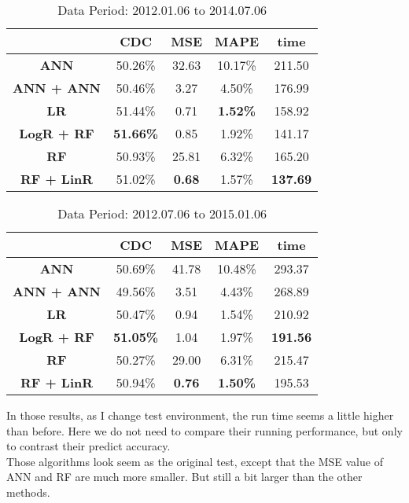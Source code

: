 \begin{table}[h]
	\centering
	\begin{tabular}{|c|c|c|c|c|}
		\hline
		\textbf{}         & \textbf{CDC}     & \textbf{MSE}  & \textbf{MAPE}   & \textbf{time}   \\ \hline
		\textbf{ANN}       & 50.26\%          & 32.63         & 10.17\%         & 211.50          \\ \hline
		\textbf{ANN + ANN} & 50.46\%          & 3.27          & 4.50\%          & 176.99          \\ \hline
		\textbf{LR}        & 51.44\%          & 0.71          & \textbf{1.52\%} & 158.92          \\ \hline
		\textbf{LogR + RF} & \textbf{51.66\%} & 0.85          & 1.92\%          & 141.17          \\ \hline
		\textbf{RF}        & 50.93\%          & 25.81         & 6.32\%          & 165.20          \\ \hline
		\textbf{RF + LinR} & 51.02\%          & \textbf{0.68} & 1.57\%          & \textbf{137.69} \\ \hline
	\end{tabular}
	\caption{Data Period: 2012.01.06 to 2014.07.06}
	\label{tb:DataPeriod3}
\end{table}


\begin{table}[h]
	\centering
	\begin{tabular}{|c|c|c|c|c|}
		\hline
		& \textbf{CDC}     & \textbf{MSE}  & \textbf{MAPE}   & \textbf{time}   \\ \hline
		\textbf{ANN}       & 50.69\%          & 41.78         & 10.48\%         & 293.37          \\ \hline
		\textbf{ANN + ANN} & 49.56\%          & 3.51          & 4.43\%          & 268.89          \\ \hline
		\textbf{LR}        & 50.47\%          & 0.94          & 1.54\%          & 210.92          \\ \hline
		\textbf{LogR + RF} & \textbf{51.05\%} & 1.04          & 1.97\%          & \textbf{191.56} \\ \hline
		\textbf{RF}        & 50.27\%          & 29.00         & 6.31\%          & 215.47          \\ \hline
		\textbf{RF + LinR} & 50.94\%          & \textbf{0.76} & \textbf{1.50\%} & 195.53          \\ \hline
	\end{tabular}
	\caption{Data Period: 2012.07.06 to 2015.01.06}
	\label{tb:DataPeriod4}
\end{table}

\clearpage

In those results, as I change test environment, the run time seems a little higher than before. Here we do not need to compare their running performance, but only to contrast their predict accuracy.\\

Those algorithms look seem as the original test, except that the MSE value of ANN and RF are much more smaller. But still a bit larger than the other methods.